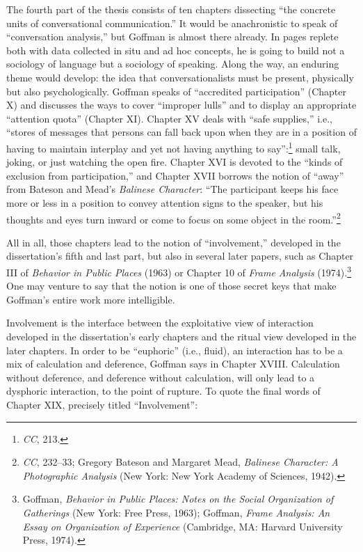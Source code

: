 \documentclass[openany,nobib]{tufte-book}
\begin{document}
The fourth part of the thesis consists of ten chapters dissecting ``the
concrete units of conversational communication.'' It would be
anachronistic to speak of ``conversation analysis,'' but Goffman is
almost there already. In pages replete both with data collected in situ
and ad hoc concepts, he is going to build not a sociology of language
but a sociology of speaking. Along the way, an enduring theme would
develop: the idea that conversationalists must be present, physically
but also psychologically. Goffman speaks of ``accredited participation''
(Chapter X) and discusses the ways to cover ``improper lulls'' and to
display an appropriate ``attention quota'' (Chapter XI). Chapter XV
deals with ``safe supplies,'' i.e., ``stores of messages that persons
can fall back upon when they are in a position of having to maintain
interplay and yet not having anything to say'':\footnote{\emph{CC}, 213.}
small talk, joking, or just watching the open fire. Chapter XVI is
devoted to the ``kinds of exclusion from participation,'' and Chapter
XVII borrows the notion of ``away'' from Bateson and Mead's
\emph{Balinese Character}: ``The participant keeps his face more or less
in a position to convey attention signs to the speaker, but his thoughts
and eyes turn inward or come to focus on some object in the
room.''\footnote{\emph{CC}, 232--33; Gregory Bateson and Margaret Mead,
  \emph{Balinese Character: A Photographic Analysis} (New York: New York
  Academy of Sciences, 1942).}

All in all, those chapters lead to the notion of ``involvement,''
developed in the dissertation's fifth and last part, but also in several
later papers, such as Chapter III of \emph{Behavior in Public Places}
(1963) or Chapter 10 of \emph{Frame Analysis} (1974).\footnote{Goffman,
  \emph{Behavior in Public Places: Notes on the Social Organization of
  Gatherings} (New York: Free Press, 1963); Goffman, \emph{Frame
  Analysis: An Essay on Organization of Experience} (Cambridge, MA:
  Harvard University Press, 1974).} One may venture to say that the
notion is one of those secret keys that make Goffman's entire work more
intelligible.

Involvement is the interface between the exploitative view of
interaction developed in the dissertation's early chapters and the
ritual view developed in the later chapters. In order to be ``euphoric''
(i.e., fluid), an interaction has to be a mix of calculation and
deference, Goffman says in Chapter XVIII. Calculation without deference,
and deference without calculation, will only lead to a dysphoric
interaction, to the point of rupture. To quote the final words of
Chapter XIX, precisely titled ``Involvement'':
\end{document}
